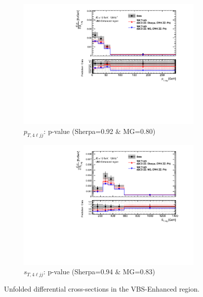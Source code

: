 \begin{figure}[!htb]
\begin{subfigure}{.48\textwidth}
        \includegraphics[width=.98\linewidth]{figures/Results/CrossSection_VBSEnhanced/xs_ptzzjj_SR.pdf}
        \caption{ \footnotesize{$p_{T,4\ell jj}$: p-value (Sherpa=0.92 $\&$ MG=0.80)}}
    \end{subfigure}
    \begin{subfigure}{.48\textwidth}
        \centering
        \includegraphics[width=.98\linewidth]{figures/Results/CrossSection_VBSEnhanced/xs_stzzjj_SR.pdf}
        \caption{ \footnotesize{$s_{T, 4\ell jj}$: p-value (Sherpa=0.94 $\&$ MG=0.83)}}
    \end{subfigure}
    \caption{Unfolded differential cross-sections in the VBS-Enhanced region.} \label{fig:unfolded_xs_VBS_Enhanced_a}
\end{figure}

